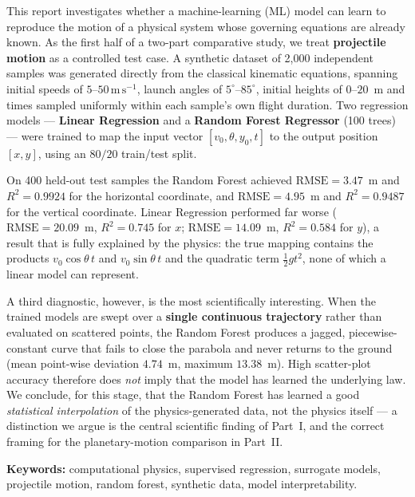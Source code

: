 \documentclass[11pt,a4paper]{article}
\newcommand{\vzero}{v_{0}}
\newcommand{\yzero}{y_{0}}
\newcommand{\ms}{\,\mathrm{m\,s^{-1}}}
\newcommand{\Rsq}{R^{2}}
\begin{document}
This report investigates whether a machine-learning (ML) model can learn to reproduce the motion
of a physical system whose governing equations are already known. As the first half of a two-part
comparative study, we treat \textbf{projectile motion} as a controlled test case. A synthetic
dataset of 2{,}000 independent samples was generated directly from the classical kinematic
equations, spanning initial speeds of $5$--$50\ms$, launch angles of $5^\circ$--$85^\circ$,
initial heights of $0$--$20$~m and times sampled uniformly within each sample's own flight
duration. Two regression models --- \textbf{Linear Regression} and a \textbf{Random Forest
Regressor} (100 trees) --- were trained to map the input vector $[\vzero,\theta,\yzero,t]$ to the
output position $[x,y]$, using an $80/20$ train/test split.

On 400 held-out test samples the Random Forest achieved $\mathrm{RMSE}=3.47$~m and
$\Rsq=0.9924$ for the horizontal coordinate, and $\mathrm{RMSE}=4.95$~m and $\Rsq=0.9487$ for the
vertical coordinate. Linear Regression performed far worse ($\mathrm{RMSE}=20.09$~m,
$\Rsq=0.745$ for $x$; $\mathrm{RMSE}=14.09$~m, $\Rsq=0.584$ for $y$), a result that is fully
explained by the physics: the true mapping contains the products $\vzero\cos\theta\,t$ and
$\vzero\sin\theta\,t$ and the quadratic term $\tfrac{1}{2}gt^{2}$, none of which a linear model
can represent.

A third diagnostic, however, is the most scientifically interesting. When the trained models are
swept over a \textbf{single continuous trajectory} rather than evaluated on scattered points, the
Random Forest produces a jagged, piecewise-constant curve that fails to close the parabola and
never returns to the ground (mean point-wise deviation $4.74$~m, maximum $13.38$~m). High
scatter-plot accuracy therefore does \emph{not} imply that the model has learned the underlying
law. We conclude, for this stage, that the Random Forest has learned a good \emph{statistical
interpolation} of the physics-generated data, not the physics itself --- a distinction we argue is
the central scientific finding of Part~I, and the correct framing for the planetary-motion
comparison in Part~II.

\vspace{0.5em}
\noindent\textbf{Keywords:} computational physics, supervised regression, surrogate models,
projectile motion, random forest, synthetic data, model interpretability.

\end{document}
